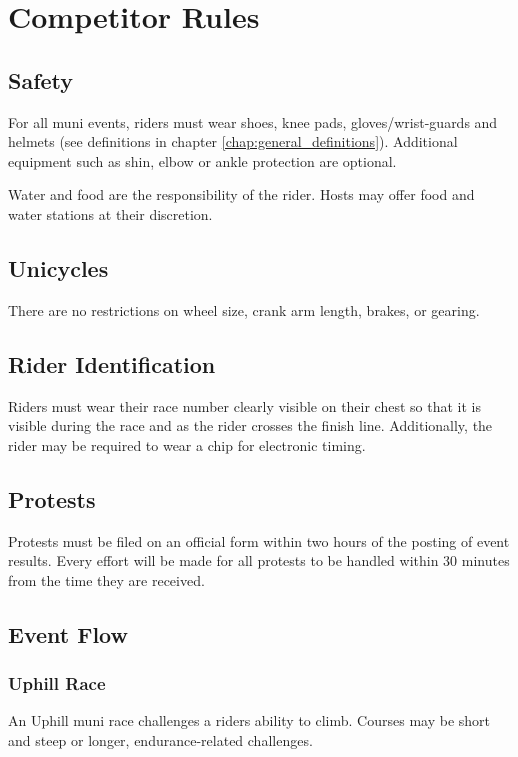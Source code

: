 \chapter{Competitor Rules}

\section{Safety}
For all muni events, riders must wear shoes, knee pads, gloves/wrist-guards and helmets (see definitions in chapter \ref{chap:general_definitions}).
Additional equipment such as shin, elbow or ankle protection are optional.

Water and food are the responsibility of the rider.
Hosts may offer food and water stations at their discretion.

\section{Unicycles}

There are no restrictions on wheel size, crank arm length, brakes, or gearing.

\section{Rider Identification}

Riders must wear their race number clearly visible on their chest so that it is visible during the race and as the rider crosses the finish line.
Additionally, the rider may be required to wear a chip for electronic timing.

\section{Protests}

Protests must be filed on an official form within two hours of the posting of event results.
Every effort will be made for all protests to be handled within 30 minutes from the time they are received.

\section{Event Flow}

\subsection{Uphill Race \label{sec:muni_uphill}}

An Uphill muni race challenges a riders ability to climb.
Courses may be short and steep or longer, endurance-related challenges.

